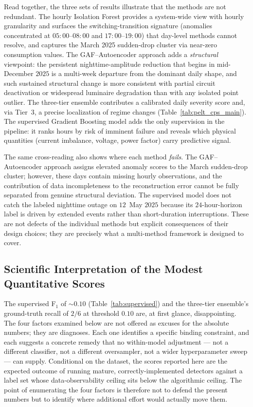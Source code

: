 \documentclass{article}
\begin{document}
Read together, the three sets of results illustrate that the methods are not redundant. The hourly Isolation Forest provides a system-wide view with hourly granularity and surfaces the switching-transition signature (anomalies concentrated at $05{:}00$--$08{:}00$ and $17{:}00$--$19{:}00$) that day-level methods cannot resolve, and captures the March 2025 sudden-drop cluster via near-zero consumption values. The GAF--Autoencoder approach adds a \emph{structural} viewpoint: the persistent nighttime-amplitude reduction that begins in mid-December $2025$ is a multi-week departure from the dominant daily shape, and such sustained structural change is more consistent with partial circuit deactivation or widespread luminaire degradation than with any isolated point outlier. The three-tier ensemble contributes a calibrated daily severity score and, via Tier~3, a precise localization of regime changes (Table~\ref{tab:pelt_cps_main}). The supervised Gradient Boosting model adds the only supervision in the pipeline: it ranks hours by risk of imminent failure and reveals which physical quantities (current imbalance, voltage, power factor) carry predictive signal.

The same cross-reading also shows where each method \emph{fails}. The GAF--Autoencoder approach assigns elevated anomaly scores to the March sudden-drop cluster; however, these days contain missing hourly observations, and the contribution of data incompleteness to the reconstruction error cannot be fully separated from genuine structural deviation. The supervised model does not catch the labeled nighttime outage on $12$~May $2025$ because its $24$-hour-horizon label is driven by extended events rather than short-duration interruptions. These are not defects of the individual methods but explicit consequences of their design choices; they are precisely what a multi-method framework is designed to cover.

\subsection{Scientific Interpretation of the Modest Quantitative Scores}
\label{subsec:low_scores}

The supervised F$_1$ of $\sim 0.10$ (Table~\ref{tab:supervised}) and the three-tier ensemble's ground-truth recall of $2/6$ at threshold $0.10$ are, at first glance, disappointing. The four factors examined below are not offered as excuses for the absolute numbers; they are diagnoses. Each one identifies a specific binding constraint, and each suggests a concrete remedy that no within-model adjustment --- not a different classifier, not a different oversampler, not a wider hyperparameter sweep --- can supply. Conditional on the dataset, the scores reported here are the expected outcome of running mature, correctly-implemented detectors against a label set whose data-observability ceiling sits below the algorithmic ceiling. The point of enumerating the four factors is therefore not to defend the present numbers but to identify where additional effort would actually move them.
\end{document}
